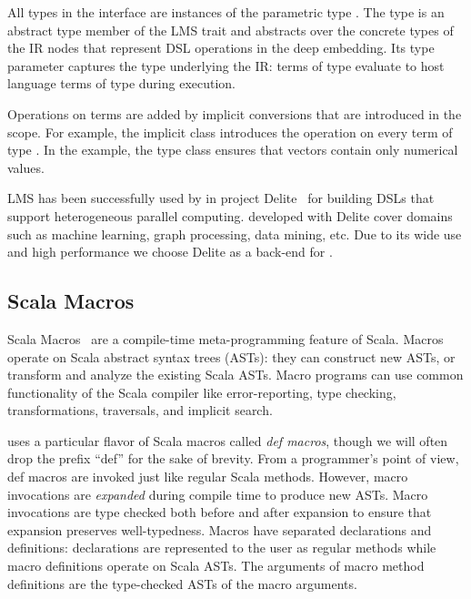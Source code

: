 All types in the  interface are instances of the
parametric type .  The  type is an abstract
type member of the  LMS trait and abstracts over the
concrete types of the IR nodes that represent DSL operations in the
deep embedding.  Its type parameter captures the type underlying the
IR: \edsl terms of type  evaluate to host language terms
of type  during \edsl execution.

Operations on  terms are added by implicit conversions that are introduced in the \edsl scope. For example, the implicit class  introduces the \code{+} operation on every term of type . In the example, the type class  ensures that vectors contain only numerical values.

LMS has been successfully used by in project Delite~\cite{brown_heterogeneous_2011,composition-ecoop2013} for building DSLs that support heterogeneous parallel computing. \edsls developed with Delite cover domains
such as machine learning, graph processing, data mining, etc. Due to its wide use and high performance we choose Delite as a back-end for \yy.


\subsection{Scala Macros}
\label{sec:scala-macros}

Scala Macros~\cite{burmako_scala_2013} are a compile-time meta-programming
feature of Scala. Macros operate on Scala abstract syntax trees (ASTs): they
can construct new ASTs, or transform and analyze the existing Scala ASTs.
Macro programs can use common functionality of the Scala compiler like
error-reporting, type checking, transformations, traversals, and implicit
search.

\yy uses a particular flavor of Scala macros called \emph{def
  macros}, though we will often drop the prefix ``def'' for the
sake of brevity.  From a programmer's point of view, def macros
are invoked just like regular Scala methods.  However, macro
invocations are \emph{expanded} during compile time to produce new
ASTs.  Macro invocations are type checked both before and after
expansion to ensure that expansion preserves well-typedness.  Macros
have separated declarations and definitions: declarations are
represented to the user as regular methods while macro definitions
operate on Scala ASTs.  The arguments of macro method definitions are
the type-checked ASTs of the macro arguments.

